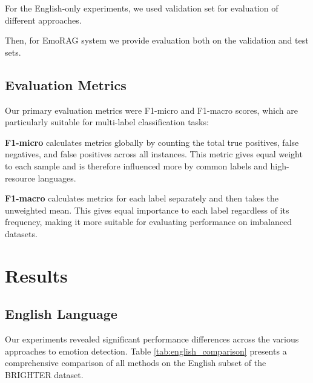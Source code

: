 \documentclass[a4paper,12pt]{extarticle}
\begin{document}
For the English-only experiments, we used validation set for evaluation of different approaches.

Then, for EmoRAG system we provide evaluation both on the validation and test sets.

\subsection{Evaluation Metrics}

Our primary evaluation metrics were F1-micro and F1-macro scores, which are particularly suitable for multi-label classification tasks:

\textbf{F1-micro} calculates metrics globally by counting the total true positives, false negatives, and false positives across all instances. This metric gives equal weight to each sample and is therefore influenced more by common labels and high-resource languages.

\textbf{F1-macro} calculates metrics for each label separately and then takes the unweighted mean. This gives equal importance to each label regardless of its frequency, making it more suitable for evaluating performance on imbalanced datasets.

\section{Results}

\subsection{English Language}

Our experiments revealed significant performance differences across the various approaches to emotion detection. Table \ref{tab:english_comparison} presents a comprehensive comparison of all methods on the English subset of the BRIGHTER dataset.
\end{document}
